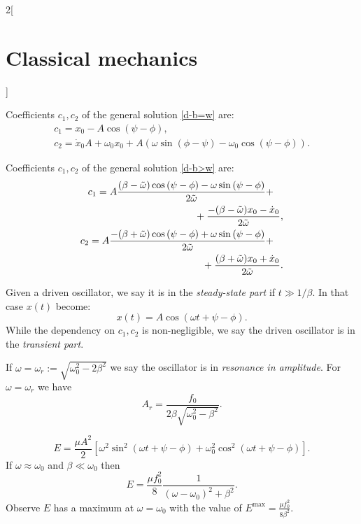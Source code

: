 \documentclass[../../../main.tex]{subfiles}
\begin{document}
\begin{multicols}{2}[\section{Classical mechanics}]
\begin{concept}
    Coefficients $c_1,c_2$ of the general solution \eqref{d-b=w} are:
    \begin{gather*}
        c_1=x_0-A\cos\left(\psi-\phi\right),\\
        c_2=\dot{x}_0A+\omega_0x_0+A\left(\omega\sin\left(\phi-\psi\right)-\omega_0\cos\left(\psi-\phi\right)\right).
    \end{gather*}
\end{concept}
\begin{concept}
    Coefficients $c_1,c_2$ of the general solution \eqref{d-b>w} are:
    \begin{equation*}
        \begin{split}
            \begin{multlined}[t]
            c_1=A\frac{(\beta-\Tilde{\omega})\cos\left(\psi-\phi\right)-\omega\sin\left(\psi-\phi\right)}{2\Tilde{\omega}}+\\+\frac{-(\beta-\Tilde{\omega})x_0-\dot{x}_0}{2\Tilde{\omega}},
            \end{multlined}\\
            \begin{multlined}[t]
            c_2=A\frac{-(\beta+\Tilde{\omega})\cos\left(\psi-\phi\right)+\omega\sin\left(\psi-\phi\right)}{2\Tilde{\omega}}+\\+\frac{(\beta+\Tilde{\omega})x_0+\dot{x}_0}{2\Tilde{\omega}}.
            \end{multlined}
        \end{split}
    \end{equation*}
\end{concept}
\begin{definition}
    Given a driven oscillator, we say it is in the \textit{steady-state part} if $t\gg 1/\beta$. In that case $x(t)$ become: $$x(t)=A\cos(\omega t+\psi-\phi).$$ While the dependency on $c_1,c_2$ is non-negligible, we say the driven oscillator is in the \textit{transient part}.
\end{definition}
\begin{concept}
    If $\omega=\omega_r:=\sqrt{\omega_0^2-2\beta^2}$ we say the oscillator is in \textit{resonance in amplitude}. For $\omega=\omega_r$ we have $$A_r=\frac{f_0}{2\beta\sqrt{\omega_0^2-\beta^2}}.$$
\end{concept}
\begin{concept}
    $$E=\frac{\mu A^2}{2}\left[\omega^2\sin^2(\omega t+\psi-\phi)+\omega_0^2\cos^2(\omega t+\psi-\phi)\right].$$ If $\omega\approx\omega_0$ and $\beta\ll\omega_0$ then $$E=\frac{\mu f_0^2}{8}\frac{1}{(\omega-\omega_0)^2+\beta^2}.$$ Observe $E$ has a maximum at $\omega=\omega_0$ with the value of $E^\text{max}=\frac{\mu f_0^2}{8\beta^2}$.

\end{concept}
\end{multicols}
\end{document}
